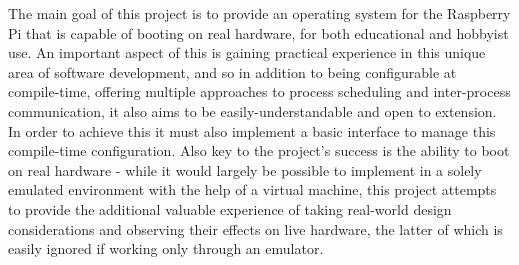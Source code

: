     The main goal of this project is to provide an operating system for the
    Raspberry Pi that is capable of booting on real hardware, for both
    educational and hobbyist use. An important aspect of this is gaining
    practical experience in this unique area of software development, and so in
    addition to being configurable at compile-time, offering multiple approaches
    to process scheduling and inter-process communication, it also aims to be
    easily-understandable and open to extension. In order to achieve this it
    must also implement a basic interface to manage this compile-time
    configuration. Also key to the project's success is the ability to boot on
    real hardware - while it would largely be possible to implement in a solely
    emulated environment with the help of a virtual machine, this project
    attempts to provide the additional valuable experience of taking real-world
    design considerations and observing their effects on live hardware, the
    latter of which is easily ignored if working only through an emulator. 

